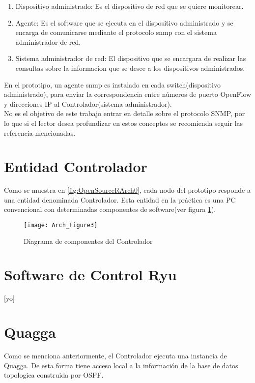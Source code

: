 \begin{enumerate}

\item Dispositivo administrado: Es el dispositivo de red que se quiere monitorear.

\item Agente: Es el software que se ejecuta en el dispositivo administrado y se encarga de comunicarse mediante el protocolo snmp con el sistema administrador de red.

\item Sistema administrador de red: El dispositivo que se encargara de realizar las consultas sobre la informacion que se desee a los dispositivos administrados.

\end{enumerate}	

En el prototipo, un agente snmp es instalado en cada switch(dispositivo administrado), para enviar la correspondencia entre números de puerto OpenFlow y direcciones IP al Controlador(sistema administrador).\\

No es el objetivo de este trabajo entrar en detalle sobre el protocolo SNMP, por lo que si el lector desea profundizar en estos conceptos se recomienda seguir las referencia mencionadas.\\

\section{Entidad Controlador}
Como se muestra en \ref{fig:OpenSourceRArch0}, cada nodo del prototipo responde a una entidad denominada Controlador. Esta entidad en la pr\'actica es una PC convencional con determinadas componentes de software(ver figura \ref{fig:OpenSourceRArch3}).

\begin{figure}[htbp!] 
\centering    
\texttt{[image: Arch\_Figure3]}
\caption[OpenSourceRArch3]{Diagrama de componentes del Controlador}
\label{fig:OpenSourceRArch3}
\end{figure}

\section{Software de Control Ryu}
[yo]

\section{Quagga}
Como se menciona anteriormente, el Controlador ejecuta una instancia de Quagga. De esta forma tiene acceso local a la información de la base de datos topologica construida por OSPF.

